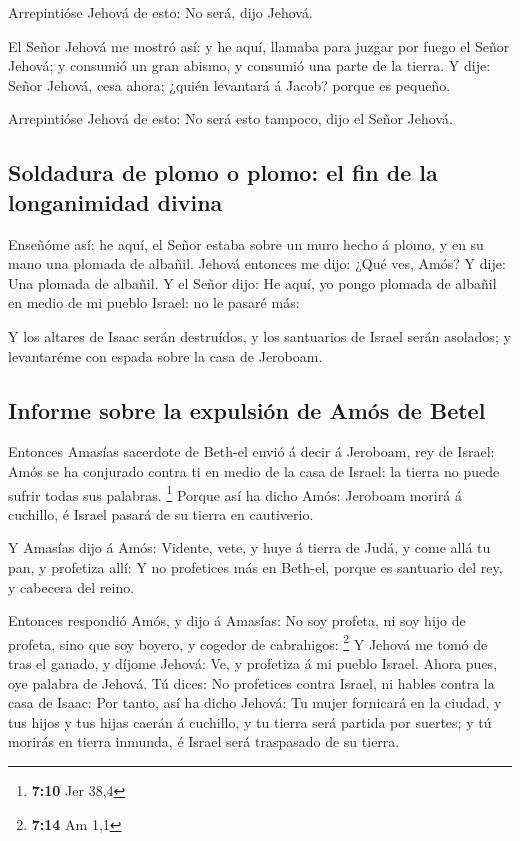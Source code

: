  Arrepintióse Jehová de esto: No será, dijo Jehová.

 El Señor Jehová me mostró así: y he aquí, llamaba para
juzgar por fuego el Señor Jehová; y consumió un gran abismo, y consumió
una parte de la tierra.  Y dije: Señor Jehová, cesa ahora;
¿quién levantará á Jacob? porque es pequeño.

 Arrepintióse Jehová de esto: No será esto tampoco, dijo
el Señor Jehová.

\hypertarget{soldadura-de-plomo-o-plomo-el-fin-de-la-longanimidad-divina}{%
\subsection{Soldadura de plomo o plomo: el fin de la longanimidad
divina}\label{soldadura-de-plomo-o-plomo-el-fin-de-la-longanimidad-divina}}

 Enseñóme así: he aquí, el Señor estaba sobre un muro
hecho á plomo, y en su mano una plomada de albañil. 
Jehová entonces me dijo: ¿Qué ves, Amós? Y dije: Una plomada de albañil.
Y el Señor dijo: He aquí, yo pongo plomada de albañil en medio de mi
pueblo Israel: no le pasaré más:

 Y los altares de Isaac serán destruídos, y los santuarios
de Israel serán asolados; y levantaréme con espada sobre la casa de
Jeroboam.

\hypertarget{informe-sobre-la-expulsiuxf3n-de-amuxf3s-de-betel}{%
\subsection{Informe sobre la expulsión de Amós de
Betel}\label{informe-sobre-la-expulsiuxf3n-de-amuxf3s-de-betel}}

 Entonces Amasías sacerdote de Beth-el envió á decir á
Jeroboam, rey de Israel: Amós se ha conjurado contra ti en medio de la
casa de Israel: la tierra no puede sufrir todas sus palabras.
\footnote{\textbf{7:10} Jer 38,4}  Porque así ha dicho
Amós: Jeroboam morirá á cuchillo, é Israel pasará de su tierra en
cautiverio.

 Y Amasías dijo á Amós: Vidente, vete, y huye á tierra de
Judá, y come allá tu pan, y profetiza allí:  Y no
profetices más en Beth-el, porque es santuario del rey, y cabecera del
reino.

 Entonces respondió Amós, y dijo á Amasías: No soy
profeta, ni soy hijo de profeta, sino que soy boyero, y cogedor de
cabrahigos: \footnote{\textbf{7:14} Am 1,1}  Y Jehová me
tomó de tras el ganado, y díjome Jehová: Ve, y profetiza á mi pueblo
Israel.  Ahora pues, oye palabra de Jehová. Tú dices: No
profetices contra Israel, ni hables contra la casa de Isaac:
 Por tanto, así ha dicho Jehová: Tu mujer fornicará en la
ciudad, y tus hijos y tus hijas caerán á cuchillo, y tu tierra será
partida por suertes; y tú morirás en tierra inmunda, é Israel será
traspasado de su tierra.

